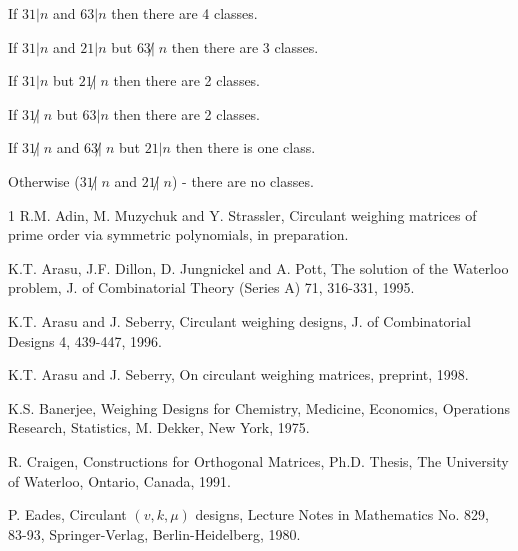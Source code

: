{{{\begin{itemize}
	      If $31|n$ and $63|n$ then there are 4 classes.

	      If $31|n$ and $21|n$ but $63 \not| \; n$ then there are 3 classes. 

	      If $31|n$ but $21 \not| \; n$ then there are 2 classes.

	      If $31 \not| \; n$ but $63|n$ then there are 2 classes.

	      If $31 \not| \; n$ and $63 \not| \; n$ but $21 | n$ then there is one class. 

	      Otherwise ($31 \not| \; n$ and $21 \not| \; n$) - there are no classes.

\end{itemize}


}

\begin{thebibliography}{1}
    R.M. Adin, M. Muzychuk and Y. Strassler, Circulant weighing matrices of 
    prime order via symmetric polynomials, in preparation.
  
    K.T. Arasu, J.F. Dillon, D. Jungnickel and A. Pott, The solution of the
    Waterloo problem, J. of Combinatorial Theory (Series A) 71, 316-331, 1995.
  
    K.T. Arasu and J. Seberry, Circulant weighing designs, J. of 
    Combinatorial Designs 4, 439-447, 1996.
  
    K.T. Arasu and J. Seberry, On circulant weighing matrices, preprint, 1998.  


    K.S. Banerjee, Weighing Designs for Chemistry, Medicine, Economics, Operations 
    Research, Statistics, M. Dekker, New York, 1975.
  

  
    R. Craigen, Constructions for Orthogonal Matrices, Ph.D. Thesis, 
    The  University of Waterloo, Ontario, Canada, 1991.

  

    P. Eades, Circulant $(v,k, \mu)$ designs, Lecture Notes in Mathematics 
    No. 829, 83-93, Springer-Verlag, Berlin-Heidelberg, 1980.
  

\end{thebibliography}}}

